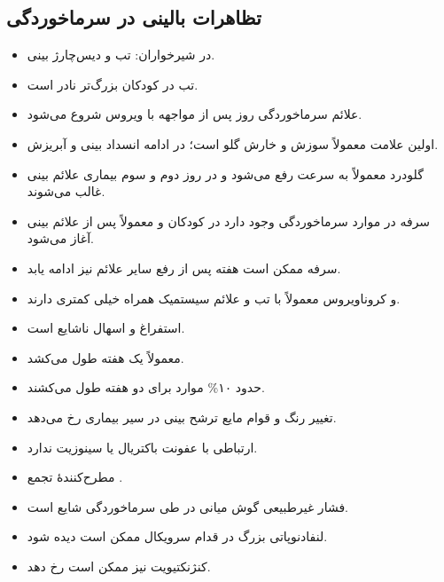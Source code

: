 \documentclass[12pt,a4paper]{article}
\begin{document}
\subsection*{تظاهرات بالینی در سرماخوردگی}
\begin{itemize}
\item در شیرخواران: تب و دیس‌چارژ بینی.
\item تب در کودکان بزرگ‌تر نادر است.
\item علائم سرماخوردگی  روز پس از مواجهه با ویروس شروع می‌شود.
\item اولین علامت معمولاً سوزش و خارش گلو است؛ در ادامه انسداد بینی و آبریزش.
\item گلودرد معمولاً به سرعت رفع می‌شود و در روز دوم و سوم بیماری علائم بینی غالب می‌شوند.
\item سرفه در  موارد سرماخوردگی وجود دارد در کودکان و معمولاً پس از علائم بینی آغاز می‌شود.
\item سرفه ممکن است  هفته پس از رفع سایر علائم نیز ادامه یابد.
\item {} و کروناویروس معمولاً با تب و علائم سیستمیک همراه خیلی کمتری دارند.
\item استفراغ و اسهال ناشایع است.
\item معمولاً یک هفته طول می‌کشد.
\item حدود ۱۰\% موارد برای دو هفته طول می‌کشند.
\item تغییر رنگ و قوام مایع ترشح بینی در سیر بیماری رخ می‌دهد.
\item ارتباطی با عفونت باکتریال یا سینوزیت ندارد.
\item مطرح‌کنندهٔ تجمع .
\end{itemize}

\begin{itemize}
\item فشار غیرطبیعی گوش میانی در طی سرماخوردگی شایع است.
\item لنفادنوپاتی بزرگ در قدام سرویکال ممکن است دیده شود.
\item کنژنکتیویت نیز ممکن است رخ دهد.
\end{itemize}
\end{document}
